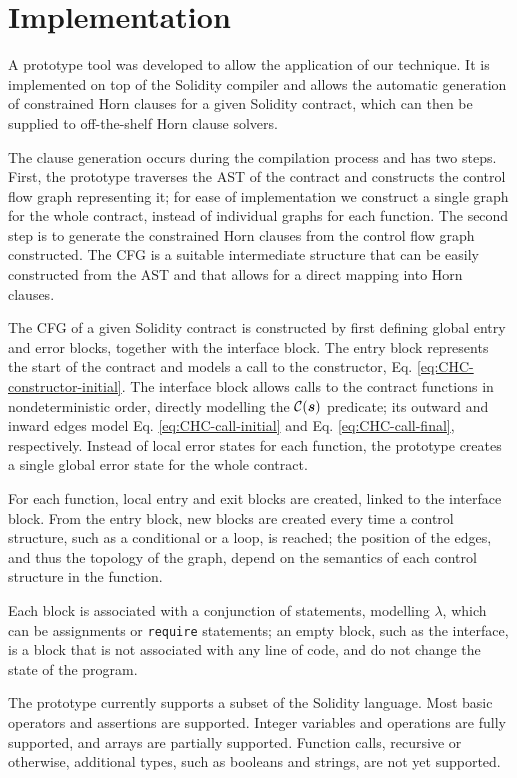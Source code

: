 \newpage
\section{Implementation}

A prototype tool was developed to allow the application of our technique. It is implemented on top of the Solidity compiler and allows the automatic generation of constrained Horn clauses for a given Solidity contract, which can then be supplied to off-the-shelf Horn clause solvers.

The clause generation occurs during the compilation process and has two steps. First, the prototype traverses the AST of the contract and constructs the control flow graph representing it; for ease of implementation we construct a single graph for the whole contract, instead of individual graphs for each function. The second step is to generate the constrained Horn clauses from the control flow graph constructed. The CFG is a suitable intermediate structure that can be easily constructed from the AST and that allows for a direct mapping into Horn clauses.

The CFG of a given Solidity contract is constructed by first defining global entry and error blocks, together with the interface block. The entry block represents the start of the contract and models a call to the constructor, Eq. \ref{eq:CHC-constructor-initial}. The interface block allows calls to the contract functions in nondeterministic order, directly modelling the $\mathcal{C}(\boldsymbol{s})$ predicate; its outward and inward edges model Eq. \ref{eq:CHC-call-initial} and Eq. \ref{eq:CHC-call-final}, respectively. Instead of local error states for each function, the prototype creates a single global error state for the whole contract.

For each function, local entry and exit blocks are created, linked to the interface block. From the entry block, new blocks are created every time a control structure, such as a conditional or a loop, is reached; the position of the edges, and thus the topology of the graph, depend on the semantics of each control structure in the function.

Each block is associated with a conjunction of statements, modelling $\lambda$, which can be assignments or \texttt{require} statements; an empty block, such as the interface, is a block that is not associated with any line of code, and do not change the state of the program.

The prototype currently supports a subset of the Solidity language. Most basic operators and assertions are supported. Integer variables and operations are fully supported, and arrays are partially supported. Function calls, recursive or otherwise, additional types, such as booleans and strings, are not yet supported.

